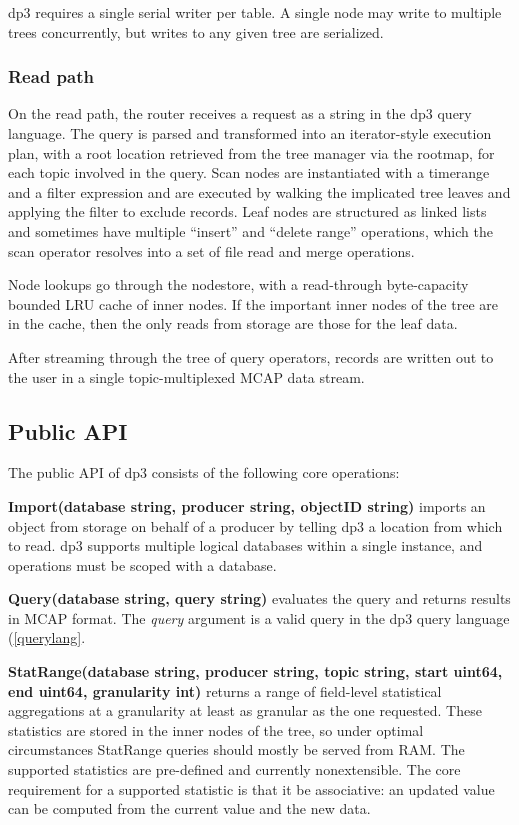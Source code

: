 \documentclass[9pt,twocolumn]{article}
\newcommand{\q}[1]{``#1''}
\begin{document}
    dp3 requires a single serial writer per table. A single node may write to
    multiple trees concurrently, but writes to any given tree are serialized.

    \subsubsection{Read path}
    On the read path, the router receives a request as a string in the dp3
    query language. The query is parsed and transformed into an iterator-style
    execution plan, with a root location retrieved from the tree manager via
    the rootmap, for each topic involved in the query. Scan nodes are
    instantiated with a timerange and a filter expression and are executed by
    walking the implicated tree leaves and applying the filter to exclude
    records. Leaf nodes are structured as linked lists and sometimes have
    multiple \q{insert} and \q{delete range} operations, which the scan
    operator resolves into a set of file read and merge operations.

    Node lookups go through the nodestore, with a read-through byte-capacity
    bounded LRU cache of inner nodes. If the important inner nodes of the tree are
    in the cache, then the only reads from storage are those for the leaf data.

    After streaming through the tree of query operators, records are written out
    to the user in a single topic-multiplexed MCAP data stream.

    \subsection{Public API} \label{api}
    The public API of dp3 consists of the following core operations:

    \textbf{Import(database string, producer string, objectID string)} imports
    an object from storage on behalf of a producer by telling dp3 a location
    from which to read. dp3 supports multiple logical databases within a single
    instance, and operations must be scoped with a database.

    \textbf{Query(database string, query string)} evaluates the query and
    returns results in MCAP format. The \textit{query} argument is a valid
    query in the dp3 query language (\ref{querylang}.

    \textbf{StatRange(database string, producer string, topic string, start
    uint64, end uint64, granularity int)} returns a range of field-level
    statistical aggregations at a granularity at least as granular as the one
    requested. These statistics are stored in the inner nodes of the tree, so
    under optimal circumstances StatRange queries should mostly be served from
    RAM. The supported statistics are pre-defined and currently nonextensible.
    The core requirement for a supported statistic is that it be associative:
    an updated value can be computed from the current value and the new data.
\end{document}
